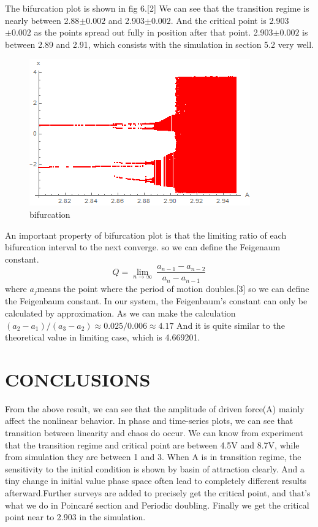\documentclass{article}
\begin{document}
The bifurcation plot is shown in fig 6.[2] We can see that the transition regime is nearly between 2.88$\pm0.002$ and 2.903$\pm0.002$. And the critical point is 2.903$\pm0.002$ as the points spread out fully in position after that point. 2.903$\pm0.002$ is between 2.89 and 2.91, which consists with the simulation in section 5.2 very well.

\begin{figure}[h]
	\centering
	\includegraphics[width=0.5\linewidth]{plot/bif}
	\caption{bifurcation}
	\label{fig:bif 7}
\end{figure}

An important property of bifurcation plot is that the limiting ratio of each bifurcation interval to the next converge. so we can define the Feigenaum constant.
\begin{equation}
Q = \lim_{n \to \infty}\ \frac{a_{n-1}-a_{n-2}}{a_{n}-a_{n-1}}
\end{equation}
where $a_j$means the point where the period of motion doubles.[3] so we can define the Feigenbaum constant. In our system, the Feigenbaum's constant can only be calculated by approximation. As we can make the calculation $ (a_2-a_1)/(a_3-a_2)\approx0.025/0.006\approx4.17$ 
And it is quite similar to the theoretical value in limiting case, which is 4.669201.


\section{\textbf{CONCLUSIONS}}
From the above result, we can see that the amplitude of driven force(A) mainly affect the nonlinear behavior. In phase and time-series plots, we can see that transition between linearity and chaos do occur. We can know from experiment that the transition regime and critical point are between 4.5V and 8.7V, while from simulation they are between 1 and 3. When A is in transition regime, the sensitivity to the initial condition is shown by basin of attraction clearly. And a tiny change in initial value phase space often lead to completely different results afterward.Further surveys are added to precisely get the critical point, and that's what we do in Poincaré section and Periodic doubling. Finally we get the critical point near to 2.903 in the simulation. 
\end{document}
